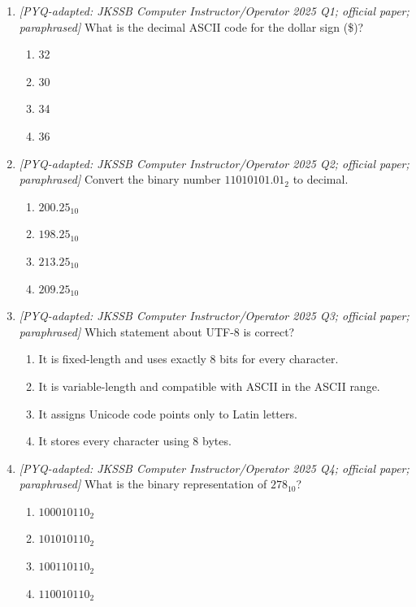 \begin{enumerate}[label=\textbf{Q\arabic*.}, leftmargin=*]
\item \textit{[PYQ-adapted: JKSSB Computer Instructor/Operator 2025 Q1;
official paper; paraphrased]} What is the decimal ASCII code for the dollar
sign (\$)?
  \begin{enumerate}[label=\Alph*.]
    \item 32
    \item 30
    \item 34
    \item 36
  \end{enumerate}
\item \textit{[PYQ-adapted: JKSSB Computer Instructor/Operator 2025 Q2;
official paper; paraphrased]} Convert the binary number
$11010101.01_2$ to decimal.
  \begin{enumerate}[label=\Alph*.]
    \item $200.25_{10}$
    \item $198.25_{10}$
    \item $213.25_{10}$
    \item $209.25_{10}$
  \end{enumerate}
\item \textit{[PYQ-adapted: JKSSB Computer Instructor/Operator 2025 Q3;
official paper; paraphrased]} Which statement about UTF-8 is correct?
  \begin{enumerate}[label=\Alph*.]
    \item It is fixed-length and uses exactly 8 bits for every character.
    \item It is variable-length and compatible with ASCII in the ASCII range.
    \item It assigns Unicode code points only to Latin letters.
    \item It stores every character using 8 bytes.
  \end{enumerate}
\item \textit{[PYQ-adapted: JKSSB Computer Instructor/Operator 2025 Q4;
official paper; paraphrased]} What is the binary representation of
$278_{10}$?
  \begin{enumerate}[label=\Alph*.]
    \item $100010110_2$
    \item $101010110_2$
    \item $100110110_2$
    \item $110010110_2$
  \end{enumerate}

\end{enumerate}
